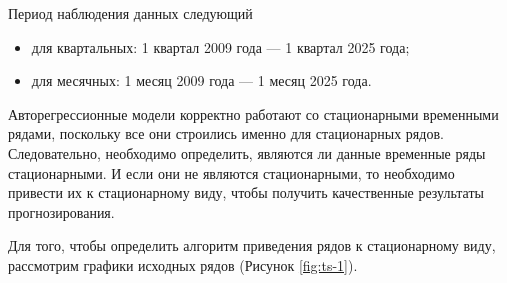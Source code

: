 \documentclass[a4paper, 14pt]{extreport}
\numberwithin{equation}{section}
\numberwithin{equation}{section}
\begin{document}
	Период наблюдения данных следующий
	\begin{itemize}
		\item для квартальных: 1 квартал 2009 года — 1 квартал 2025 года;
		\item для месячных: 1 месяц 2009 года — 1 месяц 2025 года.
	\end{itemize}
	
	Авторегрессионные модели корректно работают со стационарными временными рядами, поскольку все они строились именно для стационарных рядов. Следовательно, необходимо определить, являются ли данные временные ряды стационарными. И если они не являются стационарными, то необходимо привести их к стационарному виду, чтобы получить качественные результаты прогнозирования.
	
	Для того, чтобы определить алгоритм приведения рядов к стационарному виду, рассмотрим графики исходных рядов (Рисунок \ref{fig:ts-1}).
	
\end{document}
